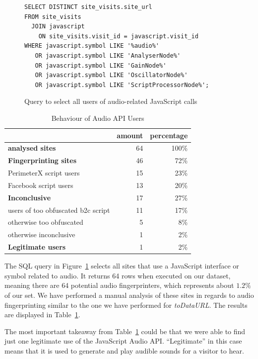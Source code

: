 \documentclass[
    fontsize=12pt,
    headings=small,
    parskip=half,
    bibliography=totoc,
    numbers=noenddot,
    open=any
    ]{scrreprt}
\begin{document}
\begin{figure}
\begin{verbatim}
SELECT DISTINCT site_visits.site_url
FROM site_visits
  JOIN javascript
    ON site_visits.visit_id = javascript.visit_id
WHERE javascript.symbol LIKE '%audio%'
   OR javascript.symbol LIKE 'AnalyserNode%'
   OR javascript.symbol LIKE 'GainNode%'
   OR javascript.symbol LIKE 'OscillatorNode%'
   OR javascript.symbol LIKE 'ScriptProcessorNode%';
\end{verbatim}
\caption{Query to select all users of audio-related JavaScript calls}
\label{code:audio_query}
\end{figure}

\begin{table}
\centering
\caption{Behaviour of Audio API Users}
\begin{tabular}{l r r}
    \toprule
    & amount & percentage \\
    \midrule
    \textbf{analysed sites} & 64 & 100\% \\
    \midrule
    \textbf{Fingerprinting sites} & 46 & 72\% \\
    PerimeterX script users & 15 & 23\% \\
    Facebook script users & 13 & 20\% \\
    \midrule
    \textbf{Inconclusive} & 17 & 27\% \\
    users of too obfuscated b2c script & 11 & 17\% \\
    otherwise too obfuscated & 5 & 8\% \\
    otherwise inconclusive & 1 & 2\% \\
    \midrule
    \textbf{Legitimate users} & 1 & 2\% \\
    \bottomrule
\end{tabular}
\label{table:audio_users}
\end{table}

The SQL query in Figure~\ref{code:audio_query} selects all sites that
use a JavaScript interface or symbol related to audio.
It returns 64 rows when executed on our dataset, meaning there are 64 potential audio
fingerprinters, which represents about $1.2\%$ of our set.
We have performed a manual analysis of these sites in regards to audio
fingerprinting similar to the one we have performed for \textit{toDataURL}.
The results are displayed in Table~\ref{table:audio_users}.

The most important takeaway from Table~\ref{table:audio_users} could be that we were
able to find just one legitimate use of the JavaScript Audio API.
``Legitimate'' in this case means that it is used to generate and play audible sounds
for a visitor to hear.
\end{document}
